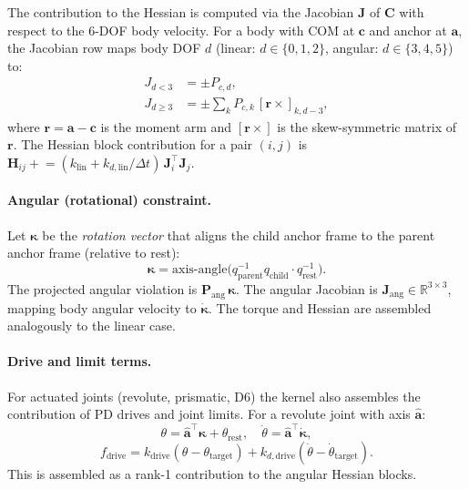\documentclass[11pt,a4paper]{article}
\begin{document}
The contribution to the Hessian is computed via the Jacobian $\mathbf{J}$ of
$\mathbf{C}$ with respect to the $6$-DOF body velocity.  For a body with COM
at $\mathbf{c}$ and anchor at $\mathbf{a}$, the Jacobian row maps body DOF
$d$ (linear: $d\in\{0,1,2\}$, angular: $d\in\{3,4,5\}$) to:
\begin{align}
  J_{d<3} &= \pm P_{c,d}, \\
  J_{d\geq 3} &= \pm \sum_k P_{c,k} \, [\mathbf{r}\times]_{k,d-3},
\end{align}
where $\mathbf{r} = \mathbf{a} - \mathbf{c}$ is the moment arm and $[\mathbf{r}\times]$
is the skew-symmetric matrix of $\mathbf{r}$.  The Hessian block contribution
for a pair $(i,j)$ is $\mathbf{H}_{ij} \mathrel{+}= (k_\text{lin} + k_{d,\text{lin}}/\Delta t)\,
\mathbf{J}_i^\top \mathbf{J}_j$.

\paragraph{Angular (rotational) constraint.}
Let $\boldsymbol{\kappa}$ be the \emph{rotation vector} that aligns the child anchor
frame to the parent anchor frame (relative to rest):
\begin{equation}
  \boldsymbol{\kappa} = \text{axis-angle}\bigl(q_{\text{parent}}^{-1}
    q_{\text{child}} \cdot q_\text{rest}^{-1}\bigr).
\end{equation}
The projected angular violation is $\mathbf{P}_\text{ang}\,\boldsymbol{\kappa}$.
The angular Jacobian is $\mathbf{J}_\text{ang} \in \mathbb{R}^{3\times 3}$,
mapping body angular velocity to $\dot{\boldsymbol{\kappa}}$.  The torque and
Hessian are assembled analogously to the linear case.

\paragraph{Drive and limit terms.}
For actuated joints (revolute, prismatic, D6) the kernel also assembles the
contribution of PD drives and joint limits.  For a revolute joint with axis
$\hat{\mathbf{a}}$:
\begin{equation}
  \theta = \hat{\mathbf{a}}^\top \boldsymbol{\kappa} + \theta_\text{rest},
  \quad
  \dot{\theta} = \hat{\mathbf{a}}^\top \dot{\boldsymbol{\kappa}},
\end{equation}
\begin{equation}
  f_\text{drive} = k_\text{drive}(\theta - \theta_\text{target})
    + k_{d,\text{drive}}(\dot{\theta} - \dot{\theta}_\text{target}).
\end{equation}
This is assembled as a rank-1 contribution to the angular Hessian blocks.
\end{document}
